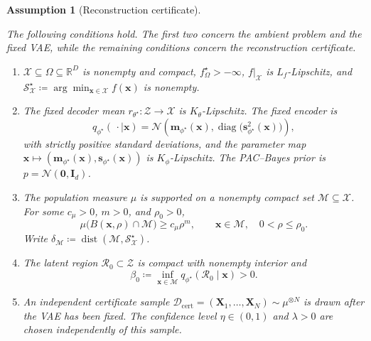 \documentclass[pdflatex,sn-mathphys-num]{sn-jnl}%
\theoremstyle{thmstyleone}%
\newtheorem{assumption}[theorem]{Assumption}
\theoremstyle{thmstyletwo}%
\theoremstyle{thmstylethree}%
\begin{document}
\begin{assumption}[Reconstruction certificate]
\label{ass:fixed-representation-certificate}

The following conditions hold. The first two concern the ambient problem and the fixed VAE, while the remaining conditions concern the reconstruction certificate.

\begin{enumerate}
  \item $\mathcal{X}\subseteq\Omega\subseteq\mathbb{R}^D$ is nonempty and compact, $f_\Omega^\star> -\infty$,   $f|_{\mathcal{X}}$ is $L_f$-Lipschitz, and $\mathcal{S}_{\mathcal{X}}^\star  \coloneq \arg\min_{\mathbf{x}\in\mathcal{X}}f(\mathbf{x})$ is nonempty.
  
  \item The fixed decoder mean $r_{\theta^\star}:\mathcal{Z}\to\mathcal{X}$ is $K_\theta$-Lipschitz.  The fixed encoder is
  \[
    q_{\phi^\star}(\,\cdot\mid\mathbf{x})
    =\mathcal{N}\!\left(\mathbf{m}_{\phi^\star}(\mathbf{x}),
      \operatorname{diag}\bigl(\mathbf{s}_{\phi^\star}^2(\mathbf{x})\bigr)\right),
  \]
  with strictly positive standard deviations, and the parameter map
  $\mathbf{x}\mapsto
  (\mathbf{m}_{\phi^\star}(\mathbf{x}),
   \mathbf{s}_{\phi^\star}(\mathbf{x}))$ 
   is $K_\phi$-Lipschitz.  The PAC--Bayes prior is $p=\mathcal{N}(\mathbf{0},\mathbf{I}_d)$.

  \item The population measure $\mu$ is supported on a nonempty compact set $\mathcal{M}\subseteq\mathcal{X}$.  For some $c_\mu>0$, $m>0$, and
  $\rho_0>0$,
  \begin{equation}
    \mu\bigl(B(\mathbf{x},\rho)\cap\mathcal{M}\bigr)
    \geq c_\mu\rho^m,
    \qquad
    \mathbf{x}\in\mathcal{M},\quad 0<\rho\leq\rho_0.
    \label{eq:local-mass-condition}
  \end{equation}
  Write $\delta_{\mathcal{M}}  \coloneq \operatorname{dist}(\mathcal{M},\mathcal{S}_{\mathcal{X}}^\star)$.

  \item The latent region $\mathcal{R}_0\subset\mathcal{Z}$ is compact with nonempty interior and
  \begin{equation}
    \beta_0 \coloneq \inf_{\mathbf{x}\in\mathcal{M}}
      q_{\phi^\star}(\mathcal{R}_0\mid\mathbf{x})>0.
    \label{eq:latent-region-mass}
  \end{equation}

  \item An independent certificate sample
  $\mathcal{D}_{\mathrm{cert}}
  =(\mathbf{X}_1,\ldots,\mathbf{X}_N)\sim\mu^{\otimes N}$ 
  is drawn after the VAE has been fixed.  The confidence level $\eta\in(0,1)$ and $\lambda>0$ are chosen independently of this sample.
  
\end{enumerate}
\end{assumption}
\end{document}
